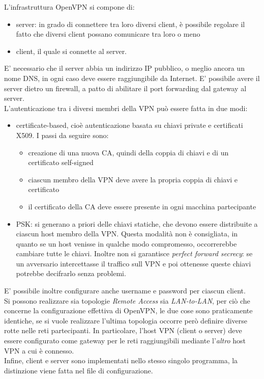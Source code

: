 L'infrastruttura OpenVPN si compone di:
\begin{itemize}
	\item server: in grado di connettere tra loro diversi client, è possibile regolare
	      il fatto che diversi client possano comunicare tra loro o meno
	\item client, il quale si connette al server.
\end{itemize}
E' necessario che il server abbia un indirizzo IP pubblico, o meglio ancora un nome DNS, in ogni caso deve
essere raggiungibile da Internet.
E' possibile avere il server dietro un firewall, a patto di abilitare il port forwarding dal gateway al server.\\
L'autenticazione tra i diversi membri della VPN può essere fatta in due modi:
\begin{itemize}
	\item certificate-based, cioè autenticazione basata su chiavi private e certificati
	      X509. I passi da seguire sono:
	      \begin{itemize}
	      	\item creazione di una nuova CA, quindi della coppia di chiavi e di un certificato
	      	      self-signed
	      	\item ciascun membro della VPN deve avere la propria coppia di chiavi e certificato
	      	\item il certificato della CA deve essere presente in ogni macchina partecipante
	      \end{itemize}
	\item PSK: si generano a priori delle chiavi statiche, che devono essere distribuite
	      a ciascun host membro della VPN. Questa modalità non è consigliata, in quanto
	      se un host venisse in qualche modo compromesso, occorrerebbe cambiare tutte le chiavi.
	      Inoltre non si garantisce \textit{perfect forward secrecy}: se un avversario
	      intercettasse il traffico sull VPN e poi ottenesse queste chiavi potrebbe
	      decifrarlo senza problemi.
\end{itemize}
E' possibile inoltre configurare anche username e password per ciascun client.\\
Si possono realizzare sia topologie \textit{Remote Access} sia \textit{LAN-to-LAN},
per ciò che concerne la configurazione effettiva di OpenVPN, le due cose
sono praticamente identiche, se si vuole realizzare l'ultima topologia occorre
però definire diverse rotte nelle reti partecipanti. In particolare,
l'host VPN (client o server) deve essere configurato come gateway per le reti
raggiungibili mediante l'\textit{altro} host VPN a cui è connesso.\\
Infine, client e server sono implementati
nello stesso singolo programma, la distinzione viene fatta nel file di configurazione.

